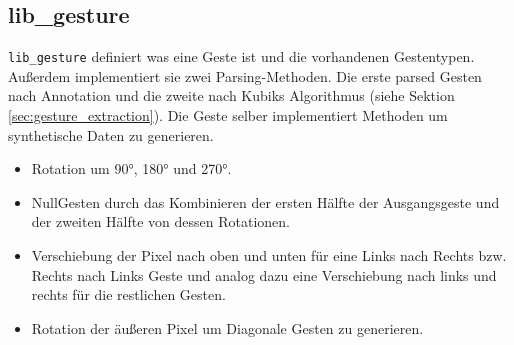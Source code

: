 \subsection{lib\_gesture}
\texttt{lib\_gesture} definiert was eine Geste ist und die vorhandenen Gestentypen. Außerdem implementiert sie zwei Parsing-Methoden. Die erste parsed Gesten nach Annotation und die zweite nach Kubiks Algorithmus (siehe
Sektion \ref{sec:gesture_extraction}). Die Geste selber implementiert Methoden um synthetische Daten zu generieren.
\begin{itemize}
    \item Rotation um 90°, 180° und 270°.
    \item NullGesten durch das Kombinieren der ersten Hälfte der Ausgangsgeste und der zweiten Hälfte von dessen Rotationen.
    \item Verschiebung der Pixel nach oben und unten für eine Links nach Rechts bzw. Rechts nach Links Geste und analog dazu eine Verschiebung nach links und rechts für die restlichen Gesten.
    \item Rotation der äußeren Pixel um Diagonale Gesten zu generieren.
\end{itemize}